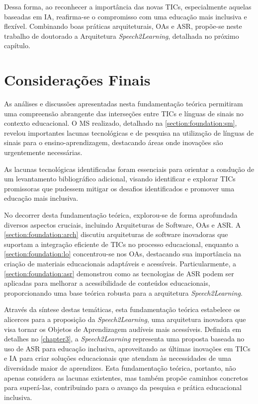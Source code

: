 Dessa forma, ao reconhecer a importância das novas TICs, especialmente aquelas baseadas em IA, reafirma-se o compromisso com uma educação mais inclusiva e flexível. Combinando boas práticas arquiteturais, OAs e ASR, propõe-se neste trabalho de doutorado a Arquitetura \textit{Speech2Learning}, detalhada no próximo capítulo.

\section{Considerações Finais}

As análises e discussões apresentadas nesta fundamentação teórica permitiram uma compreensão abrangente das interseções entre TICs e línguas de sinais no contexto educacional. O MS realizado, detalhado na \autoref{section:foundation:sm}, revelou importantes lacunas tecnológicas e de pesquisa na utilização de línguas de sinais para o ensino-aprendizagem, destacando áreas onde inovações são urgentemente necessárias. 

As lacunas tecnológicas identificadas foram essenciais para orientar a condução de um levantamento bibliográfico adicional, visando identificar e explorar TICs promissoras que pudessem mitigar os desafios identificados e promover uma educação mais inclusiva.

No decorrer desta fundamentação teórica, explorou-se de forma aprofundada diversos aspectos cruciais, incluindo Arquiteturas de Software, OAs e ASR. A \autoref{section:foundation:arch} discutiu arquiteturas de software inovadoras que suportam a integração eficiente de TICs no processo educacional, enquanto a \autoref{section:foundation:lo} concentrou-se nos OAs, destacando sua importância na criação de materiais educacionais adaptáveis e acessíveis. Particularmente, a \autoref{section:foundation:asr} demonstrou como as tecnologias de ASR podem ser aplicadas para melhorar a acessibilidade de conteúdos educacionais, proporcionando uma base teórica robusta para a arquitetura \textit{Speech2Learning}.

Através da síntese destas temáticas, esta fundamentação teórica estabelece os alicerces para a proposição da \textit{Speech2Learning}, uma arquitetura inovadora que visa tornar os Objetos de Aprendizagem audíveis mais acessíveis. Definida em detalhes no \autoref{chapter3}, a \textit{Speech2Learning} representa uma proposta baseada no uso de ASR para educação inclusiva, aproveitando as últimas inovações em TICs e IA para criar soluções educacionais que atendam às necessidades de uma diversidade maior de aprendizes. Esta fundamentação teórica, portanto, não apenas considera as lacunas existentes, mas também propõe caminhos concretos para superá-las, contribuindo para o avanço da pesquisa e prática educacional inclusiva.